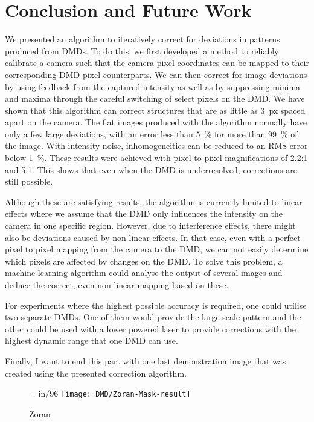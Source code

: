

\chapter{Conclusion and Future Work}
We presented an algorithm to iteratively correct for deviations in patterns produced from DMDs. To do this, we first developed a method to reliably calibrate a camera such that the camera pixel coordinates can be mapped to their corresponding DMD pixel counterparts. We can then correct for image deviations by using feedback from the captured intensity as well as by suppressing minima and maxima through the careful switching of select pixels on the DMD. 
We have shown that this algorithm can correct structures that are as little as \SI{3}{px} spaced apart on the camera. The flat images produced with the algorithm normally have only a few large deviations, with an error less than \SI{5}{\percent} for more than \SI{99}{\percent} of the image. With intensity noise, inhomogeneities can be reduced to an RMS error below \SI{1}{\percent}. These results were achieved with pixel to pixel magnifications of \num{2.2}:1 and \num{5}:1. This shows that even when the DMD is underresolved, corrections are still possible.

Although these are satisfying results, the algorithm is currently limited to linear effects where we assume that the DMD only influences the intensity on the camera in one specific region. However, due to interference effects, there might also be deviations caused by non-linear effects. In that case, even with a perfect pixel to pixel mapping from the camera to the DMD, we can not easily determine which pixels are affected by changes on the DMD. To solve this problem, a machine learning algorithm could analyse the output of several images and deduce the correct, even non-linear mapping based on these. 

For experiments where the highest possible accuracy is required, one could utilise two separate DMDs. One of them would provide the large scale pattern and the other could be used with a lower powered laser to provide corrections with the highest dynamic range that one DMD can use.

\pagebreak
\noindent Finally, I want to end this part with one last demonstration image that was created using the presented correction algorithm.

\begin{figure}[htbp]
    \captionsetup{list=no}
    \centering
    \pdfpxdimen= in/96\relax
    \texttt{[image: DMD/Zoran-Mask-result]}
    \captionsetup{list=no}
    \caption{Zoran}
    \captionsetup{list=yes}
    \addtocounter{figure}{-1}
    \label{fig:zoran}
\end{figure}
